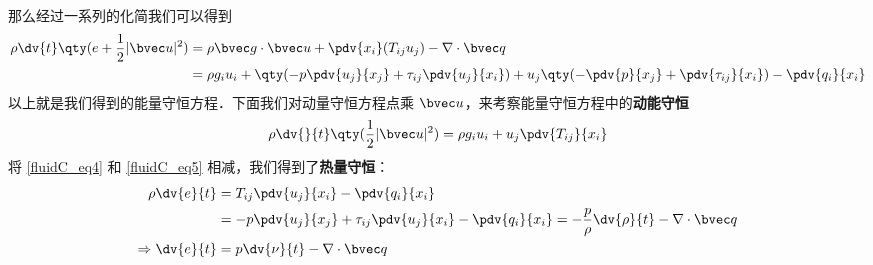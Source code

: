 那么经过一系列的化简我们可以得到
\begin{equation}\label{fluidC_eq4}
\begin{aligned}
\rho \dv{t} \qty(e+\frac{1}{2}|\bvec u|^2)&=\rho \bvec g\cdot \bvec u+\pdv{x_i} (T_{ij}u_j)-\nabla\cdot \bvec q\\
&=\rho g_iu_i+\qty(-p\pdv{u_j}{x_j}+\tau_{ij}\pdv{u_j}{x_i})+u_j\qty(-\pdv{p}{x_j}+\pdv{\tau_{ij}}{x_i})-\pdv{q_i}{x_i}
\end{aligned}
\end{equation}
以上就是我们得到的能量守恒方程．下面我们对动量守恒方程点乘 $\bvec u$，来考察能量守恒方程中的\textbf{动能守恒}
\begin{equation}\label{fluidC_eq5}
\rho \dv{}{t}\qty(\frac{1}{2}|\bvec u|^2)=\rho g_iu_i+u_j\pdv{T_{ij}}{x_i}
\end{equation}
将 \autoref{fluidC_eq4} 和 \autoref{fluidC_eq5} 相减，我们得到了\textbf{热量守恒}：
\begin{equation}
\begin{aligned}
\rho \dv{e}{t}&=T_{ij}\pdv{u_j}{x_i}-\pdv{q_i}{x_i}
\\&=-p\pdv{u_j}{x_j}+\tau_{ij}\pdv{u_j}{x_i}-\pdv{q_i}{x_i}=-\frac{p}{\rho}\dv{\rho}{t}-\nabla\cdot \bvec q\\
\Rightarrow \dv{e}{t}&=p\dv{\nu}{t}-\nabla\cdot \bvec q
\end{aligned}
\end{equation}

